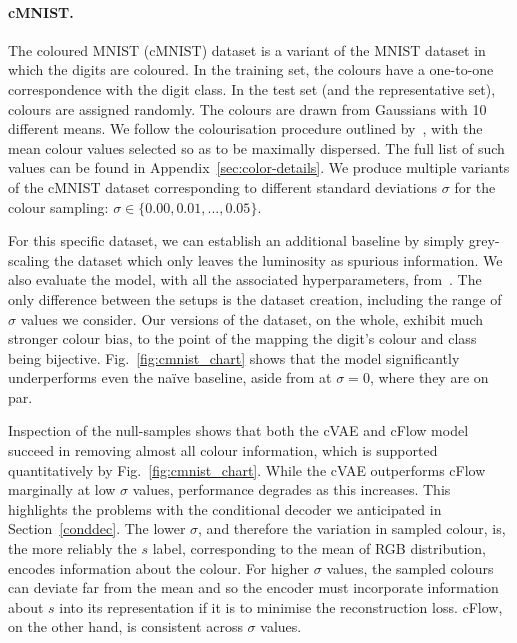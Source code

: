 \paragraph{cMNIST.}
The coloured MNIST (cMNIST) dataset is a variant of the MNIST dataset in which the digits are coloured.
In the training set, the colours have a one-to-one correspondence with the digit class.
In the test set (and the representative set), colours are assigned randomly.
The colours are drawn from Gaussians with 10 different means.
We follow the colourisation procedure outlined by~\citet{kim2019learning}, with the mean colour values selected so as to be maximally dispersed.
The full list of such values can be found in Appendix~\ref{sec:color-details}.
We produce multiple variants of the cMNIST dataset corresponding to different standard deviations $\sigma$ for the colour sampling:
$\sigma \in \{0.00, 0.01, ..., 0.05 \}$.

For this specific dataset, we can establish an additional baseline by simply grey-scaling the dataset
which only leaves the luminosity as spurious information.
We also evaluate the model, with all the associated hyperparameters, from~\citet{kim2019learning}.
The only difference between the setups is the dataset creation, including the range of $\sigma$ values we consider.
Our versions of the dataset, on the whole, exhibit much stronger colour bias, to the point of the mapping the digit's colour and class being bijective.
Fig.~\ref{fig:cmnist_chart} shows that the model significantly underperforms even the na\"ive baseline, aside from at $\sigma = 0$, where they are on par.

Inspection of the null-samples shows that both the cVAE and cFlow model succeed in removing almost all colour information, which is supported quantitatively by Fig.~\ref{fig:cmnist_chart}.
While the cVAE outperforms cFlow marginally at low $\sigma$ values, performance degrades
as this increases.
This highlights the problems with the conditional decoder we anticipated in Section~\ref{conddec}.
The lower $\sigma$, and therefore the variation in sampled colour, is, the more reliably the $s$ label, corresponding to the mean of RGB distribution, encodes information about the colour.
For higher $\sigma$ values, the sampled colours can deviate far from the mean and so the encoder must incorporate information about $s$ into its representation if it is to minimise the reconstruction loss.
cFlow, on the other hand, is consistent across $\sigma$ values.


